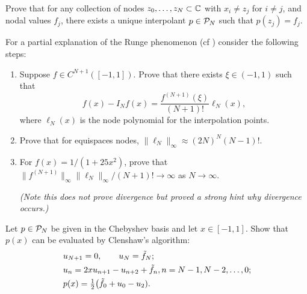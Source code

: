 

   

\begin{exercise} Prove that for any
   collection of nodes $z_0, \dots, z_N \subset \mathbb{C}$ with $x_i \neq z_j$  for $i
   \neq j$, and nodal values $f_j$, there exists a unique interpolant $p \in
   \mathcal{P}_N$ such that $p(z_j) = f_j$. 
\end{exercise}

\begin{exercise}
   \label{exr:poly:Runge Phenomenon}
   For a partial explanation of the Runge phenomenon (cf \nbpoly) consider 
   the following steps: 
   \begin{enumerate} \ilist 
      \item Suppose $f \in C^{N+1}([-1,1])$. Prove that there exists 
      $\xi \in (-1,1)$ such that 
      \[
         f(x) - I_N f(x) =  \frac{f^{(N+1)}(\xi)}{(N+1)!} 
            \ell_N(x),
      \]
      where $\ell_N(x)$ is the node polynomial for the interpolation points. 
      \item Prove that for equispaces nodes, 
      $\|\ell_N\|_\infty \approx (2N)^{N} (N-1)!$.
      \item For $f(x) = 1 / (1+25 x^2)$, prove that 
       $\| f^{(N+1)} \|_\infty \| \ell_N \|_\infty  / (N+1)! \to 
       \infty$ as $N \to \infty$.

       {\it (Note this does not prove divergence but proved a strong 
       hint why divergence occurs.)}
   \end{enumerate}
\end{exercise}


\begin{exercise}
   \label{exr:poly:clenshaw}
   Let $p \in \mathcal{P}_N$ be given in the Chebyshev basis and let $x \in [-1,1]$. 
   Show that $p(x)$ can be evaluated by Clenshaw's algorithm:
   \begin{align*}
      & u_{N+1} = 0, \qquad u_N = \tilde{f}_N; \\ 
      & u_n = 2 x u_{n+1} - u_{n+2} + \tilde{f}_n, n = N-1, N-2, \dots, 0; \\ 
      & p(x) = {\textstyle \frac{1}{2}} \big( \tilde{f}_0 + u_0 - u_2).
   \end{align*}
\end{exercise}

